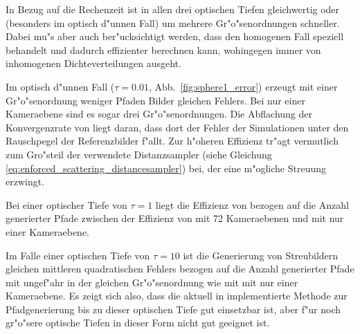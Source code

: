 	In Bezug auf die Rechenzeit ist \pirate in allen drei optischen Tiefen gleichwertig oder (besonders im optisch d"unnen Fall) um mehrere Gr"o"senordnungen schneller. Dabei mu"s aber auch ber"ucksichtigt werden, dass \pirate den homogenen Fall speziell behandelt und dadurch effizienter berechnen kann, wohingegen \mctd immer von inhomogenen Dichteverteilungen ausgeht.
	
	Im optisch d"unnen Fall ($\tau=0.01$, Abb.~\ref{fig:sphere1_error}) erzeugt \pirate mit einer Gr"o"senordnung weniger Pfaden Bilder gleichen Fehlers. Bei nur einer Kameraebene sind es sogar drei Gr"o"senordnungen. Die Abflachung der Konvergenzrate von \pirate liegt daran, dass dort der Fehler der Simulationen unter den Rauschpegel der Referenzbilder f"allt. Zur h"oheren Effizienz tr"agt vermutlich zum Gro"steil der verwendete Distanzsampler (siehe Gleichung \ref{eq:enforced_scattering_distancesampler}) bei, der eine m"ogliche Streuung erzwingt.
	
	Bei einer optischer Tiefe von $\tau=1$ liegt die Effizienz von \pirate bezogen auf die Anzahl generierter Pfade zwischen der Effizienz von \mctd mit 72 Kameraebenen und \mctd mit nur einer Kameraebene.
	
	Im Falle einer optischen Tiefe von $\tau=10$ ist die Generierung von Streubildern gleichen mittleren quadratischen Fehlers bezogen auf die Anzahl generierter Pfade mit \pirate ungef"ahr in der gleichen Gr"o"senordnung wie mit \mctd mit nur einer Kameraebene. Es zeigt sich also, dass die aktuell in \pirate implementierte Methode zur Pfadgenerierung bis zu dieser optischen Tiefe gut einsetzbar ist, aber f"ur noch gr"o"sere optische Tiefen in dieser Form nicht gut geeignet ist.

